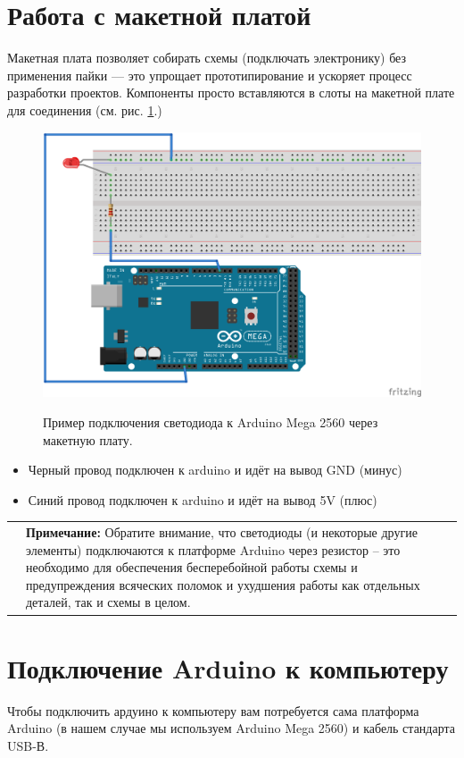 \documentclass[a4paper,twoside]{book}
\newcommand{\note}[1]{
  \vspace{8pt}
  \begin{tabularx}{\textwidth}{m{1cm} m{9cm}}
    
    & \textbf{Примечание:} #1 \\
  \end{tabularx}
}
\begin{document}
\section{Работа с макетной платой}

Макетная плата позволяет собирать схемы (подключать электронику) без применения
пайки --- это упрощает прототипирование и ускоряет процесс разработки проектов.
Компоненты просто вставляются в слоты на макетной плате для соединения
(см. рис. \ref{fig:breadboard-led}.)

\begin{figure}[ht]
  \centering
  \caption{Пример подключения светодиода к Arduino Mega 2560 через макетную
    плату.}
  \includegraphics[width=12cm]{schematics/001-led}
  \label{fig:breadboard-led}
\end{figure}

\begin{itemize}
\item Черный провод подключен к arduino и идёт на вывод GND (минус)
\item Синий провод подключен к arduino и идёт на вывод 5V (плюс)
\end{itemize}

\note{ Обратите внимание, что светодиоды (и некоторые другие элементы)
  подключаются к платформе Arduino через резистор -- это необходимо для
  обеспечения бесперебойной работы схемы и предупреждения всяческих поломок и
  ухудшения работы как отдельных деталей, так и схемы в целом.  }

\section{Подключение Arduino к компьютеру}
Чтобы подключить ардуино к компьютеру вам потребуется сама платформа Arduino (в
нашем случае мы используем Arduino Mega 2560) и кабель стандарта USB-В.
\end{document}

